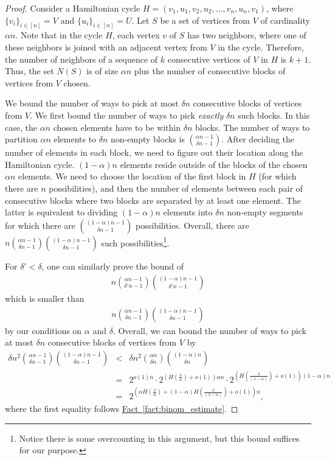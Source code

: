 \documentclass[11pt]{article}
\numberwithin{equation}{section}
\theoremstyle{definition}
\theoremstyle{plain}
\newcommand{\expref}[2]{\hyperref[#2]{#1~\ref{#2}}}
\theoremstyle{plain}
\begin{document}
\begin{proof}
  Consider a Hamiltonian cycle $H=(v_1,u_1,v_2,u_2,\ldots, v_n,u_n,v_1)$, where $\{v_i\}_{i\in [n]}=V$ and $\{u_i\}_{i\in [n]}=U$. Let $S$ be
%
a  %
set of vertices from $V$ of cardinality $\alpha n$. Note that in the cycle $H$, each vertex $v$ of $S$ has two neighbors, where one of these neighbors is joined with  an adjacent vertex from $V$ in the cycle. Therefore, the number of neighbors of a sequence of $k$ consecutive vertices of $V$ in $H$ is $k+1$. Thus, the set $N(S)$ is of size $\alpha n$ plus the number of consecutive blocks of vertices from $V$ chosen.
	
	We bound the number of ways to pick at most $\delta n$ consecutive blocks of vertices from $V$. We first bound the number of ways to pick \emph{exactly} $\delta n$ such blocks.
	In this case, the $\alpha n$ chosen elements have to be within $\delta n$ blocks. The number of ways to partition $\alpha n$ elements to $\delta n$
non-empty %
blocks is $\binom{\alpha n - 1}{\delta n - 1}$. After deciding the number of elements in each block, we need to figure out their  location along the Hamiltonian cycle. $(1-\alpha)n$ elements reside outside of the blocks of 
the  %
chosen $\alpha n$ elements. We need to %
choose  %
the location of the first block in $H$ (for which there are $n$ possibilities), and then the number of %
elements   %
%
between each pair of consecutive blocks %
where two blocks are separated by at least one element. The latter is equivalent to %
%
dividing %
$(1-\alpha)n$ elements into $\delta n$ 
non-empty  %
%
%
segments   %
for which there are $\binom{(1-\alpha)n-1}{\delta n - 1}$ possibilities. Overall, there are $n\binom{\alpha n - 1}{\delta n - 1}\binom{(1-\alpha)n-1}{\delta n - 1}$ such possibilities\footnote{Notice
%
%
there is  %
some %
overcounting  %
in this argument, but this bound suffices for our purpose.}.
	
	For $\delta'< \delta$, one can similarly prove the bound of 
	\begin{eqnarray}
		n\binom{\alpha n - 1}{\delta' n - 1}\binom{(1-\alpha)n-1}{\delta' n - 1}
	\end{eqnarray}
	which is smaller than 
	\begin{eqnarray}
		n\binom{\alpha n - 1}{\delta n - 1}\binom{(1-\alpha)n-1}{\delta n - 1}
	\end{eqnarray} by our conditions on $\alpha$ and $\delta$. Overall, we can bound the number of ways to pick at most $\delta n$ consecutive blocks of vertices from $V$ by
	\begin{eqnarray}
		\delta n^2\binom{\alpha n - 1}{\delta n - 1}\binom{(1-\alpha)n-1}{\delta n - 1} & < & \delta n^2\binom{\alpha n}{\delta n}\binom{(1-\alpha)n}{\delta n}\\
		&=& 2^{o(1)n}\cdot 2^{(H(\frac{\delta}{ \alpha})+o(1))\alpha n}\cdot 2^{(H(\frac{\delta} {(1-\alpha)})+o(1))(1-\alpha) n}\\
		& = &2^{(\alpha H(\frac{\delta}{ \alpha})+(1-\alpha)H(\frac{\delta} {(1-\alpha)})+o(1))n},
	\end{eqnarray}
	where the first equality follows \expref{Fact}{fact:binom_estimate}.
\end{proof}
\end{document}

